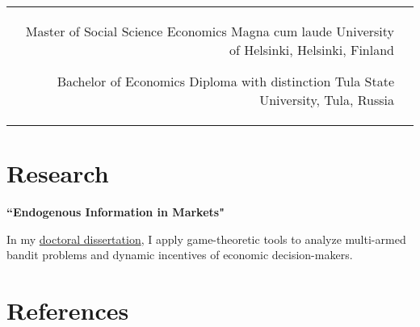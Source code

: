 \documentclass[10pt]{article} %
\begin{document}
\begin{paracol}{2}
\begin{supertabular}{rl}
	{Master of Social Science} %
	{Economics} %
	{Magna cum laude}
	{University of Helsinki, Helsinki, Finland} %
	
	
	{Bachelor of Economics} %
	{}
	{Diploma with distinction}
	{Tula State University, Tula, Russia} %
	

\end{supertabular}

\medskip %


\section{Research}

{\raggedright\textbf{``Endogenous Information in Markets"}\\\medskip}

In my \href{https://github.com/anzhukov3/Doctoral-research}{doctoral dissertation}, I apply game-theoretic tools to analyze multi-armed bandit problems and dynamic incentives of economic decision-makers. \\



\vspace{-\baselineskip}\medskip %


\section{References}


\end{paracol}
\end{document}
